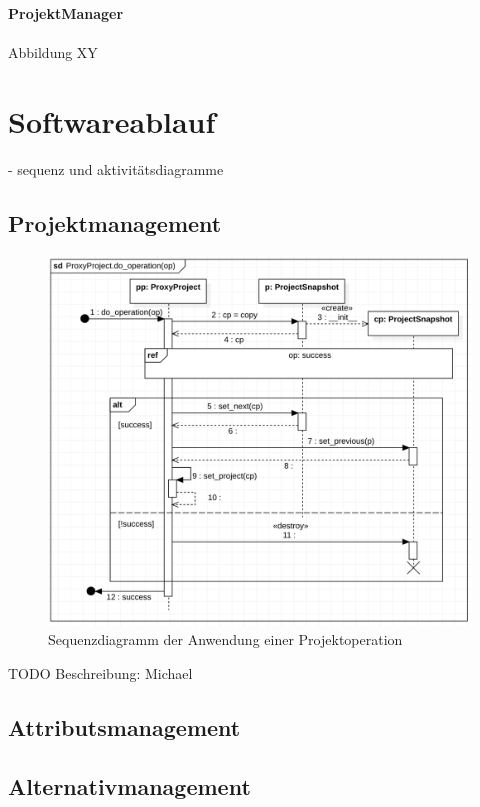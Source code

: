 \documentclass{article}
\begin{document}
\newpage
\textbf{\large{ProjektManager}}\\\\
Abbildung XY






\section{Softwareablauf}
- sequenz und aktivitätsdiagramme
\subsection{Projektmanagement}

\begin{figure}[H]%
    \centering
    \includegraphics[width=13cm]{entwurf/Entwurf_dokument/img/Michael/sd_ProxyProject.do_operation.png}
    \caption{Sequenzdiagramm der Anwendung einer Projektoperation}
\end{figure}
TODO Beschreibung: Michael

\subsection{Attributsmanagement}
\subsection{Alternativmanagement}
\end{document}
